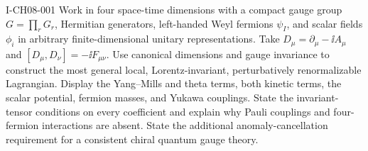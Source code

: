 \begin{exercise}{I-CH08-001}
Work in four space-time dimensions with a compact gauge group
$G=\prod_rG_r$, Hermitian generators, left-handed Weyl fermions $\psi_I$,
and scalar fields $\phi_i$ in arbitrary finite-dimensional unitary
representations.  Take $D_\mu=\partial_\mu-\ii A_\mu$ and
$[D_\mu,D_\nu]=-\ii F_{\mu\nu}$.  Use canonical dimensions and gauge
invariance to construct the most general local, Lorentz-invariant,
perturbatively renormalizable Lagrangian.  Display the Yang--Mills and theta
terms, both kinetic terms, the scalar potential, fermion masses, and Yukawa
couplings.  State the invariant-tensor conditions on every coefficient and
explain why Pauli couplings and four-fermion interactions are absent.  State
the additional anomaly-cancellation requirement for a consistent chiral
quantum gauge theory.
\end{exercise}
